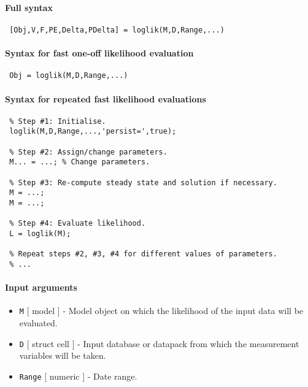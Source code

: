 


	\paragraph{Full syntax}
 
 \begin{verbatim}
 [Obj,V,F,PE,Delta,PDelta] = loglik(M,D,Range,...)
 \end{verbatim}
 
 \paragraph{Syntax for fast one-off likelihood evaluation}
 
 \begin{verbatim}
 Obj = loglik(M,D,Range,...)
 \end{verbatim}
 
 \paragraph{Syntax for repeated fast likelihood evaluations}
 
 \begin{verbatim}
 % Step #1: Initialise.
 loglik(M,D,Range,...,'persist=',true);
 
 % Step #2: Assign/change parameters.
 M... = ...; % Change parameters.
 
 % Step #3: Re-compute steady state and solution if necessary.
 M = ...;
 M = ...;
 
 % Step #4: Evaluate likelihood.
 L = loglik(M);
 
 % Repeat steps #2, #3, #4 for different values of parameters.
 % ...
 \end{verbatim}
 
 \paragraph{Input arguments}
 
 \begin{itemize}
 \item
   \texttt{M} {[} model {]} - Model object on which the likelihood of the
   input data will be evaluated.
 \item
   \texttt{D} {[} struct \textbar{} cell {]} - Input database or datapack
   from which the measurement variables will be taken.
 \item
   \texttt{Range} {[} numeric {]} - Date range.
 \end{itemize}
 
